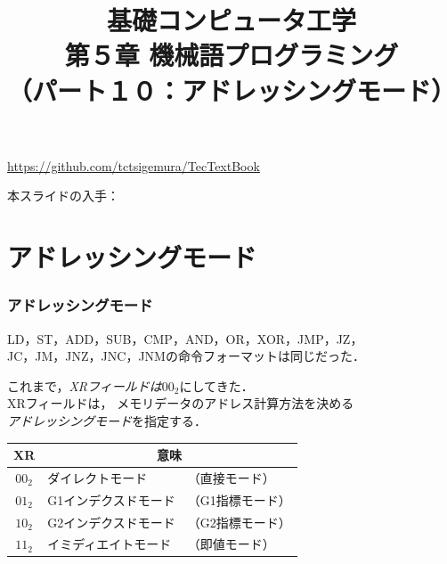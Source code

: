 \documentclass[handout]{beamer}        %
\begin{document}
\title{基礎コンピュータ工学\\第５章 機械語プログラミング\\
      （パート１０：アドレッシングモード）}
\date{}

\begin{frame}
  \titlepage
  \centerline{\url{https://github.com/tctsigemura/TecTextBook}}
  \vfill
  \centerline{本スライドの入手：
    }
\end{frame}


\section{アドレッシングモード}
\begin{frame}
  \frametitle{アドレッシングモード}
  LD，ST，ADD，SUB，CMP，AND，OR，XOR，JMP，JZ，\\
  JC，JM，JNZ，JNC，JNMの命令フォーマットは同じだった．
  \twoByte{\OP}{\GR~\XR}{\A}

  これまで，\emph{XRフィールドは$00_2$}にしてきた．\\
  XRフィールドは，
  メモリデータのアドレス計算方法を決める\\
  \emph{アドレッシングモード}を指定する．\\

  {\small\begin{center}
    \begin{tabular}{c|l l}
      \hline
      \hline
      XR & \multicolumn{2}{|c}{意味} \\
      \hline
      $00_2$ & ダイレクトモード     & （直接モード）   \\
      $01_2$ & G1インデクスドモード & （G1指標モード） \\
      $10_2$ & G2インデクスドモード & （G2指標モード） \\
      $11_2$ & イミディエイトモード & （即値モード）   \\
    \end{tabular}
  \end{center}}
  \vfill
  \vfill
\end{frame}
\end{document}
